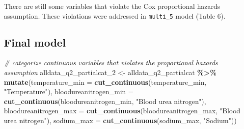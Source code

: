 \documentclass[
]{article}
\newenvironment{Shaded}{\begin{snugshade}}{\end{snugshade}}
\newcommand{\AttributeTok}[1]{\textcolor[rgb]{0.13,0.29,0.53}{#1}}
\newcommand{\CommentTok}[1]{\textcolor[rgb]{0.56,0.35,0.01}{\textit{#1}}}
\newcommand{\FunctionTok}[1]{\textcolor[rgb]{0.13,0.29,0.53}{\textbf{#1}}}
\newcommand{\NormalTok}[1]{#1}
\newcommand{\OtherTok}[1]{\textcolor[rgb]{0.56,0.35,0.01}{#1}}
\newcommand{\SpecialCharTok}[1]{\textcolor[rgb]{0.81,0.36,0.00}{\textbf{#1}}}
\newcommand{\StringTok}[1]{\textcolor[rgb]{0.31,0.60,0.02}{#1}}
\begin{document}
There are still some variables that violate the Cox proportional hazards
assumption. These violations were addressed in \texttt{multi\_5} model
(Table 6).

\hypertarget{final-model}{%
\subsection{Final model}\label{final-model}}

\begin{Shaded}
\begin{Highlighting}[]
\CommentTok{\# categorize continuous variables that violates the proportional hazards assumption}
\NormalTok{alldata\_q2\_partialcat\_2 }\OtherTok{\textless{}{-}}\NormalTok{ alldata\_q2\_partialcat }\SpecialCharTok{\%\textgreater{}\%}
  \FunctionTok{mutate}\NormalTok{(}\AttributeTok{temperature\_min =} \FunctionTok{cut\_continuous}\NormalTok{(temperature\_min, }\StringTok{"Temperature"}\NormalTok{),}
         \AttributeTok{bloodureanitrogen\_min =} \FunctionTok{cut\_continuous}\NormalTok{(bloodureanitrogen\_min, }\StringTok{"Blood urea nitrogen"}\NormalTok{),}
         \AttributeTok{bloodureanitrogen\_max =} \FunctionTok{cut\_continuous}\NormalTok{(bloodureanitrogen\_max, }\StringTok{"Blood urea nitrogen"}\NormalTok{),}
         \AttributeTok{sodium\_max =} \FunctionTok{cut\_continuous}\NormalTok{(sodium\_max, }\StringTok{"Sodium"}\NormalTok{))}


\end{Highlighting}
\end{Shaded}
\end{document}
